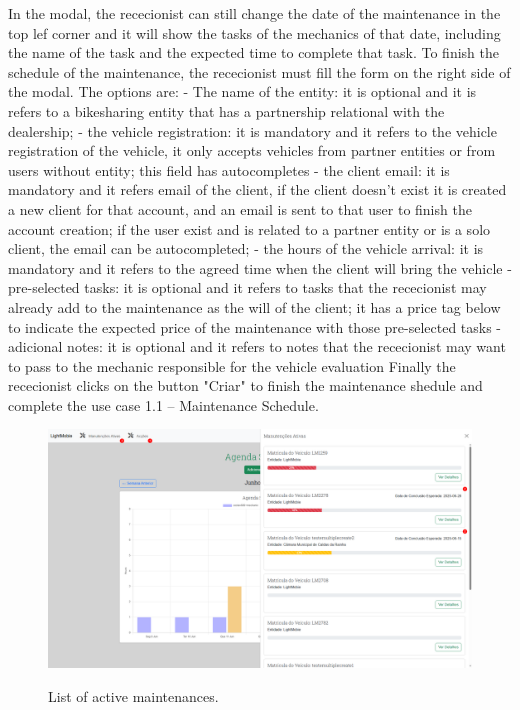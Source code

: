 In the modal, the rececionist can still change the date of the maintenance in the top lef corner and it will show the tasks of the mechanics of that date, including the name of the task and the expected time to complete that task.
To finish the schedule of the maintenance, the rececionist must fill the form on the right side of the modal.
The options are:
- The name of the entity: it is optional and it is refers to a bikesharing entity that has a partnership relational with the dealership;
- the vehicle registration: it is mandatory and it refers to the vehicle registration of the vehicle, it only accepts vehicles from partner entities or from users without entity; this field has autocompletes
- the client email: it is mandatory and it refers email of the client, if the client doesn't exist it is created a new client for that account, and an email is sent to that user to finish the account creation;  if the user exist and is related to a partner entity or is a solo client, the email can be autocompleted;
- the hours of the vehicle arrival: it is mandatory and it refers to the agreed time when the client will bring the vehicle
- pre-selected tasks: it is optional and it refers to tasks that the rececionist may already add to the maintenance as the will of the client; it has a price tag below to indicate the expected price of the maintenance with those pre-selected tasks
- adicional notes: it is optional and it refers to notes that the rececionist may want to pass to the mechanic responsible for the vehicle evaluation
Finally the rececionist clicks on the button "Criar" to finish the maintenance shedule and complete the use case 1.1 – Maintenance Schedule.

\begin{figure}[h]
  \caption{List of active maintenances.}
  \centering
  \includegraphics[width=\textwidth]{figs/Implementation/rececionist/activeMaintenances}
  \label{fig:figure2}
\end{figure}

